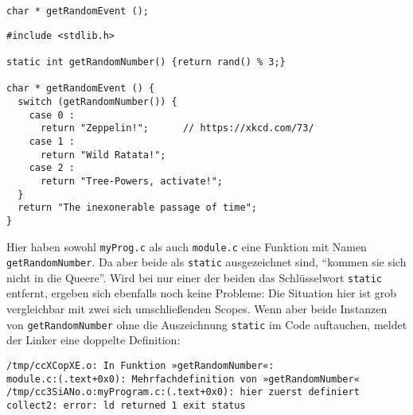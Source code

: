 \begin{codebox}
\begin{verbatim}
char * getRandomEvent ();
\end{verbatim}
\end{codebox}

\begin{codebox}
\begin{verbatim}
#include <stdlib.h>

static int getRandomNumber() {return rand() % 3;}

char * getRandomEvent () {
  switch (getRandomNumber()) {
    case 0 :
      return "Zeppelin!";      // https://xkcd.com/73/
    case 1 :
      return "Wild Ratata!";
    case 2 :
      return "Tree-Powers, activate!";
  }
  return "The inexonerable passage of time";
}
\end{verbatim}
\end{codebox}

Hier haben sowohl \texttt{myProg.c} als auch \texttt{module.c} eine Funktion mit Namen \texttt{getRandomNumber}. Da aber beide als \texttt{static} ausgezeichnet sind, \enquote{kommen sie sich nicht in die Queere}. Wird bei nur einer der beiden das Schlüsselwort \texttt{static} entfernt, ergeben sich ebenfalls noch keine Probleme: Die Situation hier ist grob vergleichbar mit zwei sich umschließenden Scopes. Wenn aber beide Instanzen von \texttt{getRandomNumber} ohne die Auszeichnung \texttt{static} im Code auftauchen, meldet der Linker eine doppelte Definition:

\begin{cmdbox}
\begin{verbatim}
/tmp/ccXCopXE.o: In Funktion »getRandomNumber«:
module.c:(.text+0x0): Mehrfachdefinition von »getRandomNumber«
/tmp/cc3SiANo.o:myProgram.c:(.text+0x0): hier zuerst definiert
collect2: error: ld returned 1 exit status
\end{verbatim}
\end{cmdbox}

